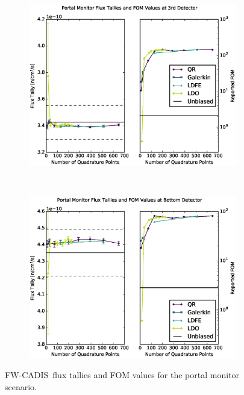 \documentclass{article} %
\newcommand{\fwc}{\mbox{FW-CADIS}}
\begin{document}
\clearpage
\begin{figure}[!htb]
\ContinuedFloat
\begin{subfigure}{\textwidth}
\centering
\includegraphics[max height=0.445\textheight]
{img/portal-fwcadis-3.eps}
\end{subfigure}
\\
\begin{subfigure}{\textwidth}
\centering
\includegraphics[max height=0.445\textheight]
{img/portal-fwcadis-4.eps}
\end{subfigure}
\caption{\fwc\ flux tallies and FOM values for the portal monitor scenario.}
\label{cargo-fwc}
\end{figure}
\end{document}
